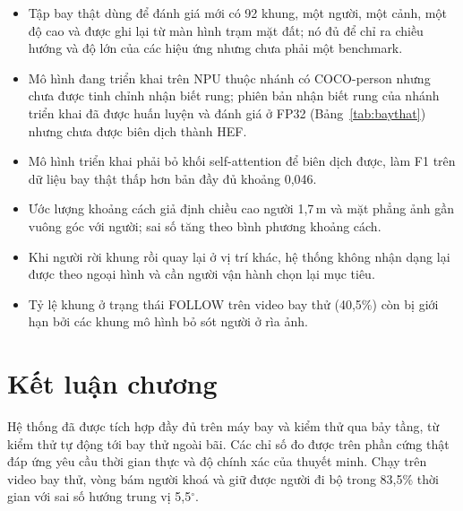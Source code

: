 \begin{itemize}
\item Tập bay thật dùng để đánh giá mới có 92 khung, một người, một cảnh, một độ cao và được ghi lại từ màn hình trạm mặt đất; nó đủ để chỉ ra chiều hướng và độ lớn của các hiệu ứng nhưng chưa phải một benchmark.
\item Mô hình đang triển khai trên NPU thuộc nhánh có COCO-person nhưng chưa được tinh chỉnh nhận biết rung; phiên bản nhận biết rung của nhánh triển khai đã được huấn luyện và đánh giá ở FP32 (Bảng~\ref{tab:baythat}) nhưng chưa được biên dịch thành HEF.
\item Mô hình triển khai phải bỏ khối self-attention để biên dịch được, làm F1 trên dữ liệu bay thật thấp hơn bản đầy đủ khoảng 0,046.
\item Ước lượng khoảng cách giả định chiều cao người 1,7\,m và mặt phẳng ảnh gần vuông góc với người; sai số tăng theo bình phương khoảng cách.
\item Khi người rời khung rồi quay lại ở vị trí khác, hệ thống không nhận dạng lại được theo ngoại hình và cần người vận hành chọn lại mục tiêu.
\item Tỷ lệ khung ở trạng thái FOLLOW trên video bay thử (40,5\%) còn bị giới hạn bởi các khung mô hình bỏ sót người ở rìa ảnh.
\end{itemize}

\section{Kết luận chương}

Hệ thống đã được tích hợp đầy đủ trên máy bay và kiểm thử qua bảy tầng, từ kiểm thử tự động tới bay thử ngoài bãi. Các chỉ số đo được trên phần cứng thật đáp ứng yêu cầu thời gian thực và độ chính xác của thuyết minh. Chạy trên video bay thử, vòng bám người khoá và giữ được người đi bộ trong 83,5\% thời gian với sai số hướng trung vị 5,5$^\circ$.

